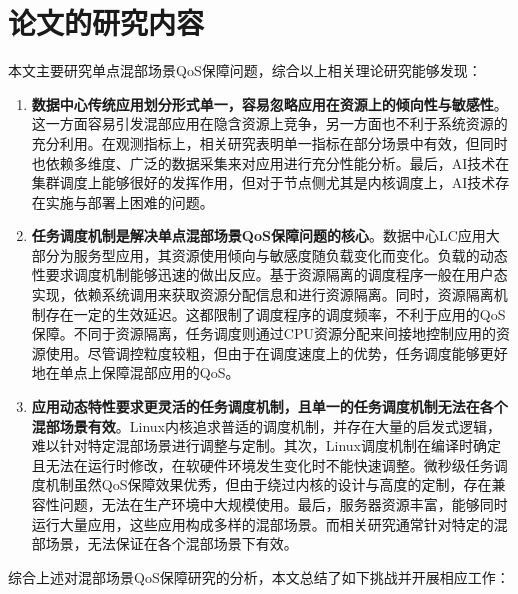 \section{论文的研究内容}

本文主要研究单点混部场景QoS保障问题，综合以上相关理论研究能够发现：

\begin{enumerate}

    \item \textbf{数据中心传统应用划分形式单一，容易忽略应用在资源上的倾向性与敏感性}。这一方面容易引发混部应用在隐含资源上竞争，另一方面也不利于系统资源的充分利用。在观测指标上，相关研究表明单一指标在部分场景中有效，但同时也依赖多维度、广泛的数据采集来对应用进行充分性能分析。最后，AI技术在集群调度上能够很好的发挥作用，但对于节点侧尤其是内核调度上，AI技术存在实施与部署上困难的问题。
    
    \item \textbf{任务调度机制是解决单点混部场景QoS保障问题的核心}。数据中心LC应用大部分为服务型应用，其资源使用倾向与敏感度随负载变化而变化。负载的动态性要求调度机制能够迅速的做出反应。基于资源隔离的调度程序一般在用户态实现，依赖系统调用来获取资源分配信息和进行资源隔离。同时，资源隔离机制存在一定的生效延迟。这都限制了调度程序的调度频率，不利于应用的QoS保障。不同于资源隔离，任务调度则通过CPU资源分配来间接地控制应用的资源使用。尽管调控粒度较粗，但由于在调度速度上的优势，任务调度能够更好地在单点上保障混部应用的QoS。
    
    \item \textbf{应用动态特性要求更灵活的任务调度机制，且单一的任务调度机制无法在各个混部场景有效}。Linux内核追求普适的调度机制，并存在大量的启发式逻辑，难以针对特定混部场景进行调整与定制。其次，Linux调度机制在编译时确定且无法在运行时修改，在软硬件环境发生变化时不能快速调整。微秒级任务调度机制虽然QoS保障效果优秀，但由于绕过内核的设计与高度的定制，存在兼容性问题，无法在生产环境中大规模使用。最后，服务器资源丰富，能够同时运行大量应用，这些应用构成多样的混部场景。而相关研究通常针对特定的混部场景，无法保证在各个混部场景下有效。

\end{enumerate}

综合上述对混部场景QoS保障研究的分析，本文总结了如下挑战并开展相应工作：

